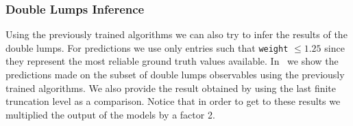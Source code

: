 \subsubsection{Double Lumps Inference}

Using the previously trained algorithms we can also try to infer the results of the double lumps.
For predictions we use only entries such that \texttt{weight} $\le 1.25$ since they represent the most reliable ground truth values available.
In~ we show the predictions made on the subset of double lumps observables using the previously trained algorithms.
We also provide the result obtained by using the last finite truncation level as a comparison.
Notice that in order to get to these results we multiplied the output of the \ml models by a factor \num{2}.

